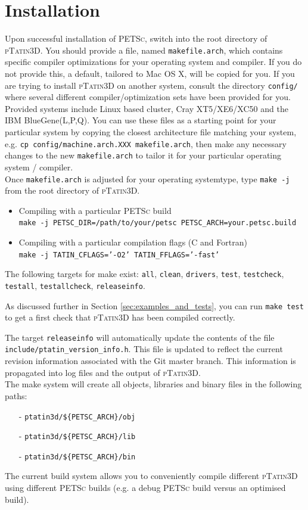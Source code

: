 \documentclass[paper=a4, fontsize=11pt,twoside]{scrartcl}
\newcommand{\ptat}{{{\textsc{pTatin3D}}}}
\newcommand{\PETSc}{{{\textsc{PETSc}}}}
\newcommand{\shellcmd}[1]{\\\indent\indent\texttt{\hspace{5mm}\footnotesize #1}\\}
\newcommand{\unix}[1]{\texttt{\footnotesize #1}}
\begin{document}
\section{Installation}
Upon successful installation of {\PETSc}, switch into the root directory of {\ptat}.
You should provide a file, named \unix{makefile.arch}, which contains specific compiler optimizations for your operating system and compiler.
If you do not provide this, a default, tailored to Mac OS X, will be copied for you.
If you are trying to install {\ptat} on another system,
consult the directory
\unix{config/}
where several different compiler/optimization sets have been provided for you. Provided systems include Linux based cluster, Cray XT5/XE6/XC50 and the  IBM BlueGene(L,P,Q). You can use these files as a starting point for your particular system by copying the closest architecture file matching your system, e.g. \unix{cp config/machine.arch.XXX makefile.arch}, then make any necessary changes to the new \unix{makefile.arch} to tailor it for your particular operating system / compiler.
\\[8pt]
%
Once \unix{makefile.arch} is adjusted for your operating systemtype, type \unix{make -j} from the root directory of \ptat{}.
\begin{itemize}
	\item Compiling with a particular {\PETSc} build
	\shellcmd{make -j PETSC\_DIR=/path/to/your/petsc PETSC\_ARCH=your.petsc.build}
	\item Compiling with a particular compilation flags (C and Fortran)
	\shellcmd{make -j TATIN\_CFLAGS='-O2' TATIN\_FFLAGS='-fast'}
\end{itemize}
%
The following targets for make exist: \unix{all}, \unix{clean}, \unix{drivers}, \unix{test}, \unix{testcheck}, \unix{testall}, \unix{testallcheck}, \unix{releaseinfo}.

As discussed further in Section \ref{sec:examples_and_tests}, you can run \unix{make test} to get a first check that {\ptat} has been compiled correctly.

The target \unix{releaseinfo} will automatically update the contents of the file \unix{include/ptatin\_version\_info.h}.
This file is updated to reflect the current revision information associated with the Git master branch. This information is
propagated into log files and the output of {\ptat}.
\\[8pt]
%
The make system will create all objects, libraries and binary files in the following paths:
\begin{enumerate}
\setlength\itemsep{0mm}
	\item[-] \unix{ptatin3d/\$\{PETSC\_ARCH\}/obj}
	\item[-] \unix{ptatin3d/\$\{PETSC\_ARCH\}/lib}
	\item[-] \unix{ptatin3d/\$\{PETSC\_ARCH\}/bin}
\end{enumerate}
The current build system allows you to conveniently compile different {\ptat} using different {\PETSc} builds (e.g. a debug {\PETSc} build versus an optimised build).
\end{document}
